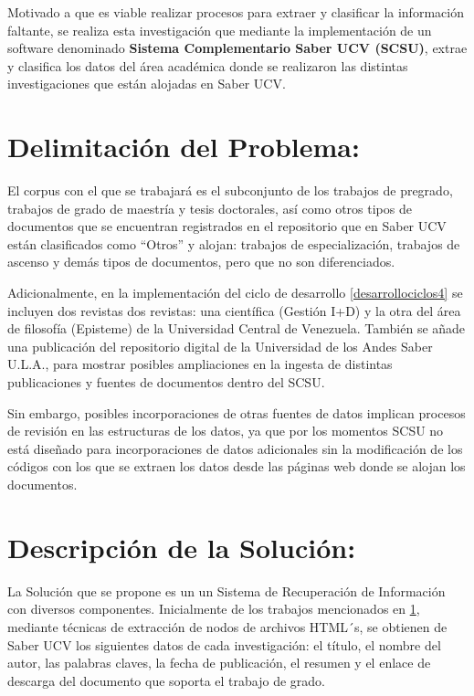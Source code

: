\documentclass[
  12pt,
  openany]{book}
\begin{document}
Motivado a que es viable realizar procesos para extraer y clasificar la información faltante, se realiza esta investigación que mediante la implementación de un software denominado \textbf{Sistema Complementario Saber UCV (SCSU)}, extrae y clasifica los datos del área académica donde se realizaron las distintas investigaciones que están alojadas en Saber UCV.

\hypertarget{delimitacion}{%
\section{Delimitación del Problema:}\label{delimitacion}}

El corpus con el que se trabajará es el subconjunto de los trabajos de pregrado, trabajos de grado de maestría y tesis doctorales, así como otros tipos de documentos que se encuentran registrados en el repositorio que en Saber UCV están clasificados como ``Otros'' y alojan: trabajos de especialización, trabajos de ascenso y demás tipos de documentos, pero que no son diferenciados.

Adicionalmente, en la implementación del ciclo de desarrollo \ref{desarrollociclos4} se incluyen dos revistas dos revistas: una científica (Gestión I+D) y la otra del área de filosofía (Episteme) de la Universidad Central de Venezuela. También se añade una publicación del repositorio digital de la Universidad de los Andes Saber U.L.A., para mostrar posibles ampliaciones en la ingesta de distintas publicaciones y fuentes de documentos dentro del SCSU.

Sin embargo, posibles incorporaciones de otras fuentes de datos implican procesos de revisión en las estructuras de los datos, ya que por los momentos SCSU no está diseñado para incorporaciones de datos adicionales sin la modificación de los códigos con los que se extraen los datos desde las páginas web donde se alojan los documentos.

\hypertarget{descripcion}{%
\section{Descripción de la Solución:}\label{descripcion}}

La Solución que se propone es un un Sistema de Recuperación de Información con diversos componentes. Inicialmente de los trabajos mencionados en \ref{delimitacion}, mediante técnicas de extracción de nodos de archivos HTML´s, se obtienen de Saber UCV los siguientes datos de cada investigación: el título, el nombre del autor, las palabras claves, la fecha de publicación, el resumen y el enlace de descarga del documento que soporta el trabajo de grado.
\end{document}
